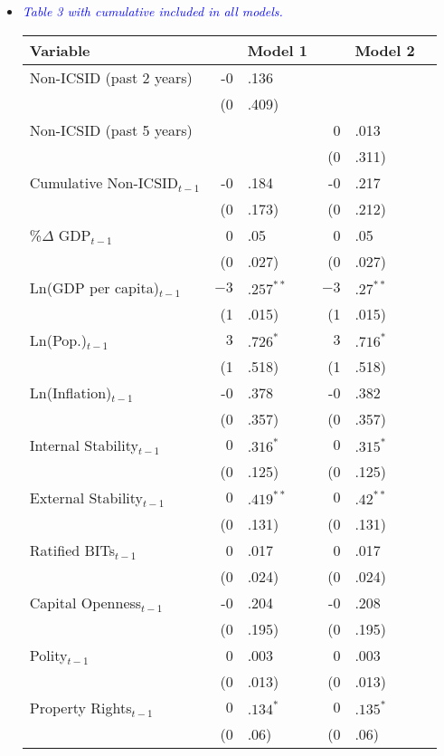 \begin{enumerate}
\begin{itemize}
		\item \textcolor{blue}{ \emph{ Table 3 with cumulative included in all models. }}

			\begin{table}[ht]
			\centering
			\begingroup\footnotesize
			\begin{tabular}{lr@{} lr@{}lr@{}}
			 Variable && Model 1 && Model 2 \\ 
			  \hline
			\hline
			Non-ICSID (past 2 years) & -0&.136 &&  \\ 
			   & (0&.409) &&  \\ 
			  Non-ICSID (past 5 years) &  && 0&.013 \\ 
			   &  && (0&.311) \\ 
			  Cumulative Non-ICSID$_{t-1}$ & -0&.184 & -0&.217 \\ 
			   & (0&.173) & (0&.212) \\ 
			  \%$\Delta$ GDP$_{t-1}$ & 0&.05 & 0&.05 \\ 
			   & (0&.027) & (0&.027) \\ 
			  Ln(GDP per capita)$_{t-1}$ & $-3$&$.257^{\ast\ast}$ & $-3$&$.27^{\ast\ast}$ \\ 
			   & (1&.015) & (1&.015) \\ 
			  Ln(Pop.)$_{t-1}$ & $3$&$.726^{\ast}$ & $3$&$.716^{\ast}$ \\ 
			   & (1&.518) & (1&.518) \\ 
			  Ln(Inflation)$_{t-1}$ & -0&.378 & -0&.382 \\ 
			   & (0&.357) & (0&.357) \\ 
			  Internal Stability$_{t-1}$ & $0$&$.316^{\ast}$ & $0$&$.315^{\ast}$ \\ 
			   & (0&.125) & (0&.125) \\ 
			  External Stability$_{t-1}$ & $0$&$.419^{\ast\ast}$ & $0$&$.42^{\ast\ast}$ \\ 
			   & (0&.131) & (0&.131) \\ 
			  Ratified BITs$_{t-1}$ & 0&.017 & 0&.017 \\ 
			   & (0&.024) & (0&.024) \\ 
			  Capital Openness$_{t-1}$ & -0&.204 & -0&.208 \\ 
			   & (0&.195) & (0&.195) \\ 
			  Polity$_{t-1}$ & 0&.003 & 0&.003 \\ 
			   & (0&.013) & (0&.013) \\ 
			  Property Rights$_{t-1}$ & $0$&$.134^{\ast}$ & $0$&$.135^{\ast}$ \\ 
			   & (0&.06) & (0&.06) \\ 

\end{tabular}
\end{table}
\end{itemize}
\end{enumerate}

